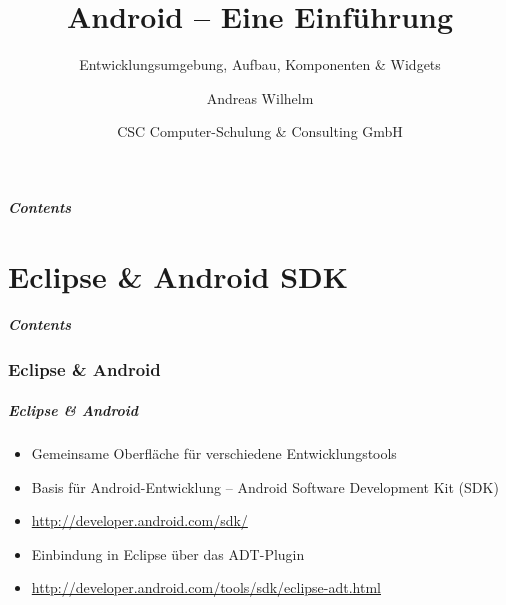 \title{Android -- Eine Einführung}
\subtitle{Entwicklungsumgebung, Aufbau, Komponenten \& Widgets}
\author[A. Wilhelm]{Andreas Wilhelm}
\titlegraphic{}
\date{CSC Computer-Schulung \& Consulting GmbH}

\begin{frame}[plain]
  \titlepage
\end{frame}

\section[Contents]{}
\begin{frame}
	\frametitle{Contents}
	\tableofcontents[onlyparts]
\end{frame}

\part{Eclipse \& Android SDK}
\frame{\partpage}
\begin{frame}
	\frametitle{Contents}
	\tableofcontents[]
\end{frame}

\section{Eclipse \& Android}
\begin{frame}[label=eclipse_sdk]
   \frametitle{Eclipse \& Android}
   \begin{itemize}
      \item Gemeinsame Oberfläche für verschiedene Entwicklungstools
      \item Basis für Android-Entwicklung -- Android Software Development Kit (SDK)
      \item \href{http://developer.android.com/sdk/}{http://developer.android.com/sdk/}
      \item Einbindung in Eclipse über das ADT-Plugin
      \item \href{http://developer.android.com/tools/sdk/eclipse-adt.html}{http://developer.android.com/tools/sdk/eclipse-adt.html}
   \end{itemize}
\end{frame}

